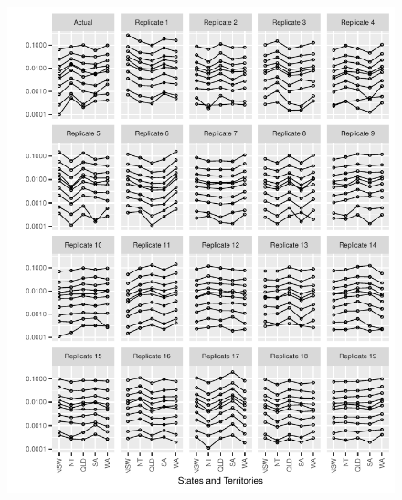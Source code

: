 \documentclass{article}
\begin{document}
\begin{figure}
  \centering
  \includegraphics{out/fig_replicate_data_Male_Indigenous_Baseline}
\end{figure}
\newpage
\end{document}
